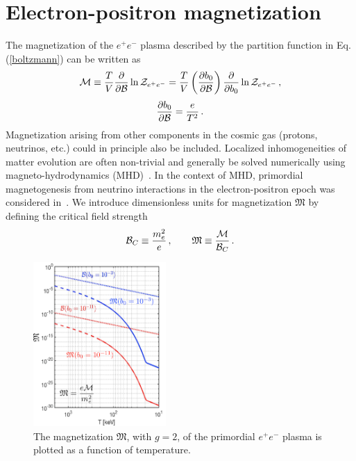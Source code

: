 \documentclass[reprint]{revtex4-2}
\newcommand{\req}[1]{Eq.\,(\ref{#1})}
\begin{document}
\section{Electron-positron magnetization}
\label{sec:magnetization}
\noindent The magnetization of the $e^{+}e^{-}$ plasma described by the partition function in \req{boltzmann} can be written as
\begin{align}
    \label{defmagetization}
    {\cal M}\equiv\frac{T}{V}\frac{\partial}{\partial{\cal B}}\ln{{\cal Z}_{e^{+}e^{-}}} = \frac{T}{V}\left(\frac{\partial b_{0}}{\partial{\cal B}}\right)\frac{\partial}{\partial b_{0}}\ln{{\cal Z}_{e^{+}e^{-}}}\,,
\end{align}
\begin{align}
    \frac{\partial b_{0}}{\partial{\cal B}}=\frac{e}{T^{2}}\,.
\end{align}
Magnetization arising from other components in the cosmic gas (protons, neutrinos, etc.) could in principle also be included. Localized inhomogeneities of matter evolution are often non-trivial and generally be solved numerically using magneto-hydrodynamics (MHD)~\cite{melrose2008quantum,vazza2017simulations}. In the context of MHD, primordial magnetogenesis from neutrino interactions in the electron-positron epoch was considered in~\cite{perrone2021neutrinoelectron}. We introduce dimensionless units for magnetization ${\mathfrak M}$ by defining the critical field strength
\begin{align}
    {\cal B}_{C}\equiv\frac{m_{e}^{2}}{e}\,,\qquad{\mathfrak M}\equiv\frac{\cal M}{{\cal B}_{C}}\,.
\end{align}

\begin{figure}[ht]
    \centering
    \includegraphics[width=0.45\textwidth]{Magnetization_Hc_new004.png}
    \caption{The magnetization ${\mathfrak M}$, with $g=2$, of the primordial $e^{+}e^{-}$ plasma is plotted as a function of temperature.}
    \label{fig:magnet} 
\end{figure}
\end{document}
